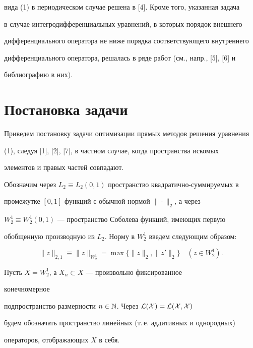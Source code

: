 вида (1) в периодическом случае решена в [4]. Кроме того, указанная задача 


в случае интегродифференциальных уравнений, в которых порядок внешнего 


дифференциального оператора не ниже порядка соответствующего внутреннего 


дифференциального оператора, решалась в ряде работ (см., напр., [5], [6] и 


библиографию в них). 


 


 


\section{Постановка задачи} 


 


Приведем постановку задачи оптимизации прямых методов решения уравнения 


(1), следуя [1], [2], [7], в частном случае, когда пространства искомых 


элементов и правых частей совпадают. 


 


Обозначим через $L_2\equiv L_2(0,1)$ пространство квадратично-суммируемых в 


промежутке $[0,1]$ функций с обычной нормой $\|\cdot\|_2$, а через 


$W^1_2\equiv W^1_2(0,1)$ --- пространство Соболева функций, имеющих первую 


обобщенную производную из $L_2$. Норму в $W^1_2$ введем следующим образом: 


$$ 


\|z\|_{2,1}\equiv\|z\|_{W^1_2}=\max\{\|z\|_2,\|z'\|_2\}\quad 


(z\in W^1_2). 


$$ 


 


Пусть $X=W^1_2$, а $X_n\subset X$ --- произвольно фиксированное 


конечномерное 


подпространство размерности $n\in\Bbb N$. Через $\cal L(X)=\cal L(X,X)$ 


будем обозначать пространство линейных (т.\,е. аддитивных и однородных) 


операторов, отображающих $X$ в себя. 



